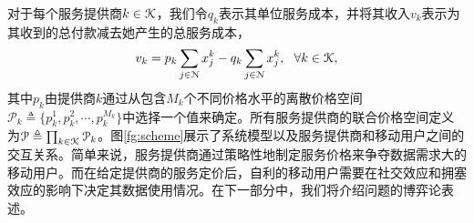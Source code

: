 对于每个服务提供商$k\in\mathcal{K}$，我们令$q_k$表示其单位服务成本，并将其收入$v_k$表示为其收到的总付款减去她产生的总服务成本，
\begin{equation}\label{eq:SPrev}
  v_k=p_k\sum_{j\in\mathcal{N}}x^k_j-q_k\sum_{j\in\mathcal{N}}x^k_j,~~\forall k\in\mathcal{K},
\end{equation}
其中$p_k$由提供商$k$通过从包含$M_k$个不同价格水平的离散价格空间$\mathcal{P}_k\triangleq\{p_k^1,p_k^2,\cdots,p_k^{M_k}\}$中选择一个值来确定。所有服务提供商的联合价格空间定义为$\mathcal{P}\triangleq\prod_ {k\in\mathcal{K}}\mathcal{P}_{k}$。图\ref{fg:scheme}展示了系统模型以及服务提供商和移动用户之间的交互关系。简单来说，服务提供商通过策略性地制定服务价格来争夺数据需求大的移动用户。而在给定提供商的服务定价后，自利的移动用户需要在社交效应和拥塞效应的影响下决定其数据使用情况。在下一部分中，我们将介绍问题的博弈论表述。
